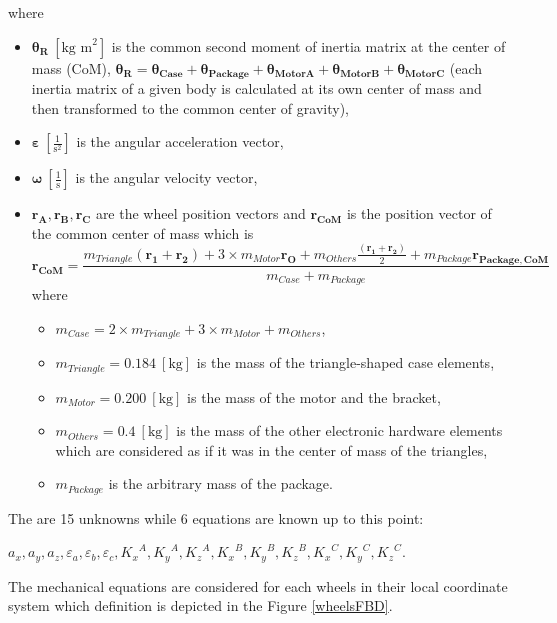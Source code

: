 \documentclass[12pt,english]{article}
\begin{document}
where \begin{itemize}
	\item $\boldsymbol{\theta_R}~[\text{kg m}^2]$ is the common second moment of inertia matrix at the center of mass (CoM), $\boldsymbol{\theta_R} = \boldsymbol{\theta_{Case}} +\boldsymbol{\theta_{Package}} + \boldsymbol{\theta_{MotorA}} + \boldsymbol{\theta_{MotorB}} + \boldsymbol{\theta_{MotorC}} $ (each inertia matrix of a given body is calculated at its own center of mass and then transformed to the common  center of gravity),
	\item $\boldsymbol{\varepsilon}~[\frac{1}{\text{s}^2}]$ is the angular acceleration  vector,
	\item $\boldsymbol{\omega}~[\frac{1}{\text{s}}]$ is the angular velocity vector,
	\item $\mathbf{r_A},\mathbf{r_B},\mathbf{r_C}$ are the wheel position vectors and $\mathbf{r_{CoM}}$ is the position vector of the common center of mass which is
	\begin{equation}
		\mathbf{r_{CoM}} = 
			\frac{
				m_{Triangle} (\mathbf{r_1}+\mathbf{r_2})		+
				3 \times m_{Motor} \mathbf{r_O}					+
				m_{Others} \frac{(\mathbf{r_1}+\mathbf{r_2})}{2} 			+ 
				m_{Package}
				\mathbf{r_{Package,CoM}}
			}{
				m_{Case}+m_{Package}
		}
	\end{equation}
	where \begin{itemize}
		\item $m_{Case} = 2 \times m_{Triangle} + 3 \times m_{Motor} + m_{Others}$,
		\item $m_{Triangle} = 0.184~[\text{kg}]$ is the mass of the triangle-shaped case elements,
		\item $m_{Motor} = 0.200~[\text{kg}]$ is the mass of the motor and the bracket,
		\item $m_{Others} = 0.4~[\text{kg}]$ is the mass of the other electronic hardware elements which are considered as if it was in the center of mass of the triangles,
		\item $m_{Package}$ is the arbitrary mass of the package.
	\end{itemize}
\end{itemize}
The are 15 unknowns while 6 equations are known up to this point: \begin{center}
	$a_x,a_y,a_z,\varepsilon_a,\varepsilon_b,\varepsilon_c,{K_x}^A,{K_y}^A,{K_z}^A,{K_x}^B,{K_y}^B,{K_z}^B,{K_x}^C,{K_y}^C,{K_z}^C$.
\end{center}
The mechanical equations are considered for each wheels in their local coordinate system which definition is depicted in the Figure \ref{wheelsFBD}. 
\end{document}
